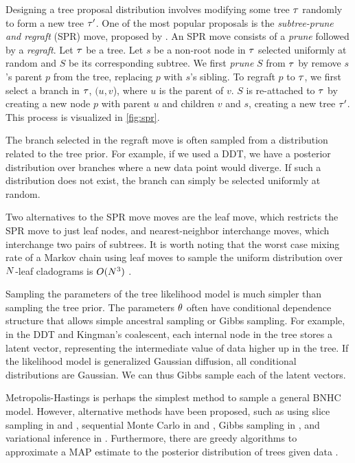 Designing a tree proposal distribution
involves modifying some tree $\tau$ 
randomly to form a new tree $\tau^\prime$.
One of the most popular proposals
is the \emph{subtree-prune and regraft} (SPR) move, proposed by \citet{Swofford1990}.
An SPR move consists of a \emph{prune} followed by a \emph{regraft}.
Let $\tau$ be a tree.
Let $s$ be a non-root
node in $\tau$ selected uniformly at random
and $S$ be its corresponding subtree.
We first \emph{prune}
$S$ from $\tau$ by
remove $s$'s parent $p$ from the tree,
replacing $p$ with $s$'s sibling.
To regraft $p$ to $\tau$,
we first select a branch in $\tau$,
$(u, v$), where $u$ is the parent of $v$.
$S$ is re-attached to $\tau$
by creating a new node $p$
with parent $u$ and children $v$ and $s$,
creating a new tree $\tau^\prime$.
This process is visualized in \autoref{fig:spr}.

The branch selected in the regraft move
is often sampled from a distribution
related to the tree prior.
For example, if we used a DDT,
we have a posterior distribution
over branches where a new data point would 
diverge. If such a distribution
does not exist, the branch can simply
be selected uniformly at random.

Two alternatives to the SPR move
moves are the leaf move,
which restricts the SPR move
to just leaf nodes,
and nearest-neighbor interchange
moves, which interchange
two pairs of subtrees.
It is worth noting
that 
the worst case mixing rate of
a Markov chain using
leaf moves to sample
the uniform distribution over
$N$-leaf cladograms is $O(N^3)$ \citep{Aldous2000}.

Sampling the parameters of 
the tree likelihood model is much simpler
than sampling the tree prior.
The parameters $\theta$ often
have conditional dependence
structure that allows simple
ancestral sampling or Gibbs sampling.
For example, in the DDT and Kingman's coalescent,
each internal node in the tree stores
a latent vector, representing the intermediate value
of data higher up in the tree.
If the likelihood model is
generalized Gaussian diffusion,
all conditional distributions are Gaussian.
We can thus Gibbs sample each of the
latent vectors.

Metropolis-Hastings is perhaps the
simplest method to sample a general
BNHC model. However, alternative methods
have been proposed,
such as using slice sampling in \citet{Adams2010} and \citet{Boyles2012},
sequential Monte Carlo in \citet{Teh2008} and \citet{Hu2013},
Gibbs sampling in \citet{Blei2010},
and variational inference in \citet{Paisley2014}.
Furthermore, there are greedy algorithms
to approximate a MAP estimate
to the posterior distribution
of trees given data \citep{Teh2008, Hu2013}.
